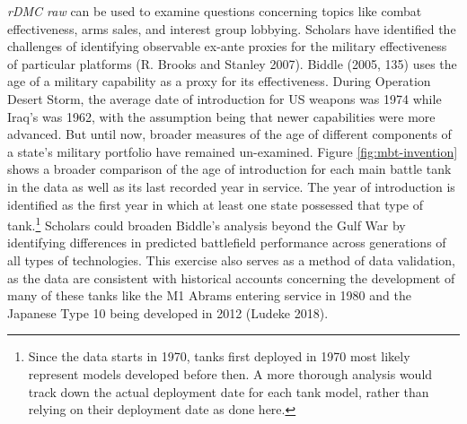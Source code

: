 \documentclass[
]{article}
\begin{document}
\emph{rDMC raw} can be used to examine questions concerning topics like combat effectiveness, arms sales, and interest group lobbying. Scholars have identified the challenges of identifying observable ex-ante proxies for the military effectiveness of particular platforms (R. Brooks and Stanley 2007). Biddle (2005, 135) uses the age of a military capability as a proxy for its effectiveness. During Operation Desert Storm, the average date of introduction for US weapons was 1974 while Iraq's was 1962, with the assumption being that newer capabilities were more advanced. But until now, broader measures of the age of different components of a state's military portfolio have remained un-examined. Figure \ref{fig:mbt-invention} shows a broader comparison of the age of introduction for each main battle tank in the data as well as its last recorded year in service. The year of introduction is identified as the first year in which at least one state possessed that type of tank.\footnote{Since the data starts in 1970, tanks first deployed in 1970 most likely represent models developed before then. A more thorough analysis would track down the actual deployment date for each tank model, rather than relying on their deployment date as done here.} Scholars could broaden Biddle's analysis beyond the Gulf War by identifying differences in predicted battlefield performance across generations of all types of technologies. This exercise also serves as a method of data validation, as the data are consistent with historical accounts concerning the development of many of these tanks like the M1 Abrams entering service in 1980 and the Japanese Type 10 being developed in 2012 (Ludeke 2018).
\end{document}
